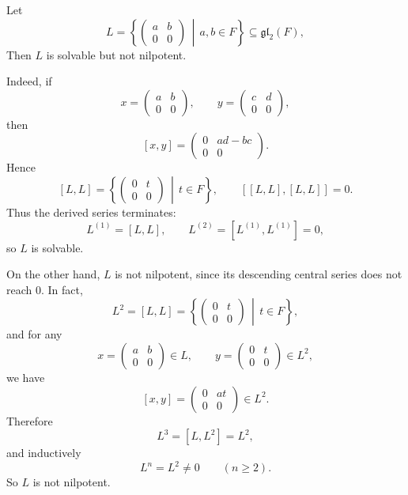 \documentclass[11pt, a4paper]{report}
\begin{document}
\begin{example}
    Let
    \[
    L=
    \left\{
    \begin{pmatrix}
    a & b\\
    0 & 0
    \end{pmatrix}
    \,\middle|\,
    a,b\in F
    \right\}
    \subseteq \mathfrak{gl}_2(F),
    \]
    Then \(L\) is solvable but not nilpotent.
    
    Indeed, if
    \[
    x=
    \begin{pmatrix}
    a & b\\
    0 & 0
    \end{pmatrix},
    \qquad
    y=
    \begin{pmatrix}
    c & d\\
    0 & 0
    \end{pmatrix},
    \]
    then
    \[
    [x,y]
    =
    \begin{pmatrix}
    0 & ad-bc\\
    0 & 0
    \end{pmatrix}.
    \]
    Hence
    \[
    [L,L]
    =
    \left\{
    \begin{pmatrix}
    0 & t\\
    0 & 0
    \end{pmatrix}
    \,\middle|\,
    t\in F
    \right\},
    \qquad
   [[L,L],[L,L]]=0.
    \]
    Thus the derived series terminates:
    \[
    L^{(1)}=[L,L],\qquad L^{(2)}=[L^{(1)},L^{(1)}]=0,
    \]
    so \(L\) is solvable.
    
    On the other hand, \(L\) is not nilpotent, since its descending central series does not reach \(0\). In fact,
    \[
    L^2=[L,L]
    =
    \left\{
    \begin{pmatrix}
    0 & t\\
    0 & 0
    \end{pmatrix}
    \,\middle|\,
    t\in F
    \right\},
    \]
    and for any
    \[
    x=
    \begin{pmatrix}
    a & b\\
    0 & 0
    \end{pmatrix}\in L,\qquad
    y=
    \begin{pmatrix}
    0 & t\\
    0 & 0
    \end{pmatrix}\in L^2,
    \]
    we have
    \[
    [x,y]
    =
    \begin{pmatrix}
    0 & at\\
    0 & 0
    \end{pmatrix}\in L^2.
    \]
    Therefore
    \[
    L^3=[L,L^2]=L^2,
    \]
    and inductively
    \[
    L^n=L^2\neq 0\qquad (n\ge 2).
    \]
    So \(L\) is not nilpotent.
    \end{example}
\end{document}
